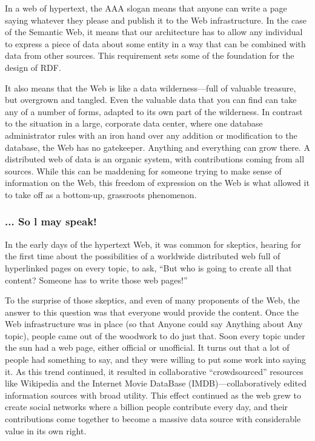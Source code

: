 In a web of hypertext, the AAA slogan means that anyone can write a page
saying whatever they please and publish it to the Web infrastructure. In
the case of the Semantic Web, it means that our
architecture has to allow any individual to express a piece of data
about some entity in a way that can be combined with data from other
sources. This requirement sets some of the foundation for the design of
RDF.

It also means that the Web is like a data wilderness---full of valuable
treasure, but overgrown and tangled. Even the valuable data that you can
find can take any of a number of forms, adapted to its own part of the
wilderness. In contrast to the situation in a large, corporate data
center, where one database administrator rules with an iron hand over
any addition or modification to the database, the Web has no gatekeeper.
Anything and everything can grow there. A distributed web of data is an
organic system, with contributions coming from all sources. While this
can be maddening for someone trying to make sense of information on the
Web, this freedom of expression on the Web is what allowed it to take
off as a bottom-up, grassroots phenomenon.

\subsubsection{... So l may speak!}

In the early days of the hypertext Web, it was common for skeptics,
hearing for the first time about the possibilities of a worldwide
distributed web full of hyperlinked pages on every topic, to ask, ``But
who is going to create all that content? Someone has to write those web
pages!''

To the surprise of those skeptics, and even of many proponents of the
Web, the answer to this question was that everyone would provide the
content. Once the Web infrastructure was in place (so that Anyone could
say Anything about Any topic), people came out of the woodwork to do
just that. Soon every topic under the sun had a web page, either
official or unofficial. It turns out that a lot of people had something
to say, and they were willing to put some work into saying it. As this
trend continued, it resulted in collaborative ``crowdsourced'' resources
like Wikipedia and the Internet Movie DataBase (IMDB)---collaboratively
edited information sources with broad utility. This effect continued as
the web grew to create social networks where a billion people contribute
every day, and their contributions come together to become a massive
data source with considerable value in its own right.

